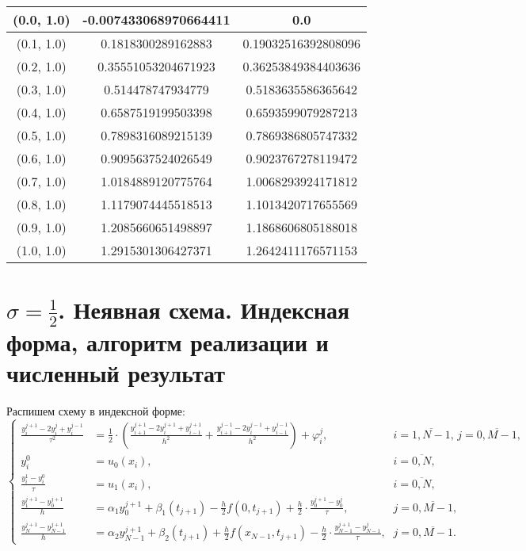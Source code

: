 \begin{table}[H]
\begin{tabular}{|c|c|c|}
\hline
(0.0, 1.0) & -0.007433068970664411 & 0.0 \\
\hline
(0.1, 1.0) & 0.1818300289162883 & 0.19032516392808096 \\
\hline
(0.2, 1.0) & 0.35551053204671923 & 0.36253849384403636 \\
\hline
(0.3, 1.0) & 0.514478747934779 & 0.5183635586365642 \\
\hline
(0.4, 1.0) & 0.6587519199503398 & 0.6593599079287213 \\
\hline
(0.5, 1.0) & 0.7898316089215139 & 0.7869386805747332 \\
\hline
(0.6, 1.0) & 0.9095637524026549 & 0.9023767278119472 \\
\hline
(0.7, 1.0) & 1.0184889120775764 & 1.0068293924171812 \\
\hline
(0.8, 1.0) & 1.1179074445518513 & 1.1013420717655569 \\
\hline
(0.9, 1.0) & 1.2085660651498897 & 1.1868606805188018 \\
\hline
(1.0, 1.0) & 1.2915301306427371 & 1.2642411176571153 \\
\hline
\end{tabular}
\end{table}
\normalsize

\section{$\sigma=\frac{1}{2}$. Неявная схема. Индексная форма, алгоритм реализации и численный результат}
Распишем схему в индексной форме:
\begin{equation}
\left\{
\begin{array}{lll}
\frac{y_{i}^{j+1}-2y_{i}^{j}+y_{i}^{j-1}}{\tau^{2}} & =\frac{1}{2}\cdot(\frac{y_{i+1}^{j+1}-2y_{i}^{j+1}+y_{i-1}^{j+1}}{h^{2}}+\frac{y_{i+1}^{j-1}-2y_{i}^{j-1}+y_{i-1}^{j-1}}{h^{2}}) + \varphi_{i}^{j}\text{,} & i=\overline{1,N-1}\text{, } j=\overline{0,M-1}\text{,}\\
y_{i}^{0} & = u_{0}(x_{i})\text{,} & i=\overline{0,N}\text{,} \\
\frac{y_{i}^{1}-y_{i}^{0}}{\tau} & = u_{1}(x_{i})\text{,} & i=\overline{0,N}\text{,} \\
\frac{y_{1}^{j+1}-y_{0}^{j+1}}{h} & = \alpha_{1}y_{0}^{j+1} + \beta_{1}(t_{j+1}) - \frac{h}{2}f(0,t_{j+1}) + \frac{h}{2}\cdot\frac{y_{0}^{j+1}-y_{0}^{j}}{\tau}\text{,} & j=\overline{0,M-1}\text{,}\\
\frac{y_{N}^{j+1}-y_{N-1}^{j+1}}{h} & = \alpha_{2}y_{N-1}^{j+1} + \beta_{2}(t_{j+1}) + \frac{h}{2}f(x_{N-1},t_{j+1}) - \frac{h}{2}\cdot\frac{y_{N-1}^{j+1}-y_{N-1}^{j}}{\tau}\text{,} & j=\overline{0,M-1}\text{.}
\end{array}
\right.
\end{equation} \par

